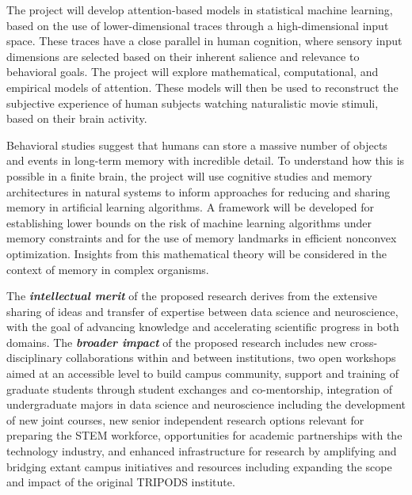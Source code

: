  The project will develop
attention-based models in statistical machine learning, based on the use
of lower-dimensional traces through a high-dimensional
input space. These traces have a close parallel in human cognition, where
sensory input dimensions are selected based on their inherent salience and
relevance to behavioral goals. The project will explore mathematical,
computational, and empirical models of attention. These models will then
be used to reconstruct the subjective experience of human subjects
watching naturalistic movie stimuli, based on their brain activity.

 Behavioral studies suggest that humans can store a massive number of 
objects and events in long-term memory with incredible detail.
To understand how this is possible in a finite brain, the project 
will use cognitive studies and memory architectures in natural systems 
to inform approaches for reducing and sharing memory in
artificial learning algorithms. A framework will be developed for
establishing lower bounds on the risk of machine learning algorithms under
memory constraints and for the use of memory landmarks in efficient nonconvex optimization. Insights from this mathematical theory will be
considered in the context of memory in complex organisms.

\vskip8pt

\noindent 
The {\it\bfseries intellectual merit} of the proposed research
derives from the extensive sharing of ideas and transfer of expertise between data science and neuroscience, with the goal of advancing 
knowledge and accelerating scientific progress in both domains. The {\it\bfseries broader impact} of the proposed research includes new cross-disciplinary collaborations within and between institutions, two open workshops aimed at an accessible level to build campus community, support and training of graduate students through student exchanges and co-mentorship, integration of undergraduate majors in data science and neuroscience including the development of new joint courses, new senior independent research options relevant for preparing the STEM workforce, opportunities for academic partnerships with the technology industry, and enhanced infrastructure for research by amplifying and bridging extant campus initiatives and resources including expanding the scope and impact of the original TRIPODS institute.

